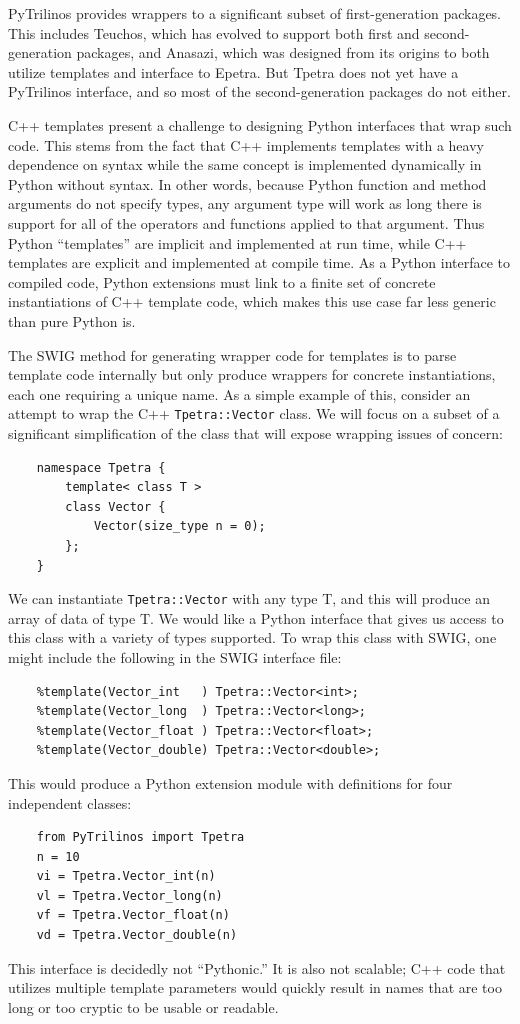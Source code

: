 \documentclass[11pt]{article}
\begin{document}
PyTrilinos provides wrappers to a significant subset of first-generation packages.  This includes Teuchos, which has evolved to support both first and second-generation packages, and Anasazi, which was designed from its origins to both utilize templates and interface to Epetra.  But Tpetra does not yet have a PyTrilinos interface, and so most of the second-generation packages do not either.

C++ templates present a challenge to designing Python interfaces that wrap such code.  This stems from the fact that C++ implements templates with a heavy dependence on syntax while the same concept is implemented dynamically in Python without syntax.  In other words, because Python function and method arguments do not specify types, any argument type will work as long there is support for all of the operators and functions applied to that argument.  Thus Python ``templates'' are implicit and implemented at run time, while C++ templates are explicit and implemented at compile time.  As a Python interface to compiled code, Python extensions must link to a finite set of concrete instantiations of C++ template code, which makes this use case far less generic than pure Python is.

The SWIG method for generating wrapper code for templates is to parse template code internally but only produce wrappers for concrete instantiations, each one requiring a unique name.  As a simple example of this, consider an attempt to wrap the C++ {\tt Tpetra::Vector} class.  We will focus on a subset of a significant simplification of the class that will expose wrapping issues of concern:
\begin{verbatim}
    namespace Tpetra {
        template< class T >
        class Vector {
            Vector(size_type n = 0);
        };
    }
\end{verbatim}
We can instantiate {\tt Tpetra::Vector} with any type T, and this will produce an array of data of type T.  We would like a Python interface that gives us access to this class with a variety of types supported.  To wrap this class with SWIG, one might include the following in the SWIG interface file:
\begin{verbatim}
    %template(Vector_int   ) Tpetra::Vector<int>;
    %template(Vector_long  ) Tpetra::Vector<long>;
    %template(Vector_float ) Tpetra::Vector<float>;
    %template(Vector_double) Tpetra::Vector<double>;
\end{verbatim}
This would produce a Python extension module with definitions for four independent classes:
\begin{verbatim}
    from PyTrilinos import Tpetra
    n = 10
    vi = Tpetra.Vector_int(n)
    vl = Tpetra.Vector_long(n)
    vf = Tpetra.Vector_float(n)
    vd = Tpetra.Vector_double(n)
\end{verbatim}
This interface is decidedly not ``Pythonic.''  It is also not scalable; C++ code that utilizes multiple template parameters would quickly result in names that are too long or too cryptic to be usable or readable.
\end{document}
